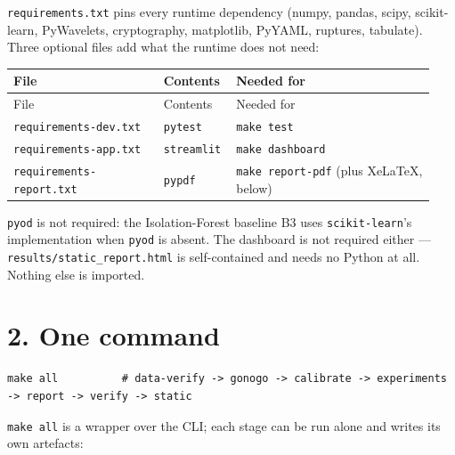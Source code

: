 \documentclass[10pt,a4paper]{article}
\begin{document}
\texttt{requirements.txt} pins every runtime dependency (numpy, pandas, scipy, scikit-\allowbreak{}learn, PyWavelets, cryptography, matplotlib, PyYAML, ruptures, tabulate). Three optional files add what the runtime does not need:

{\small
\setlength{\tabcolsep}{4.5pt}
\setlength{\LTleft}{\fill}
\setlength{\LTright}{\fill}
\begin{longtable}{>{\raggedright\arraybackslash}p{0.345\linewidth}>{\raggedright\arraybackslash}p{0.138\linewidth}>{\raggedright\arraybackslash}p{0.452\linewidth}}
\toprule
File & Contents & Needed for \\
\midrule
\endfirsthead
\toprule
File & Contents & Needed for \\
\midrule
\endhead
\bottomrule
\endlastfoot
\texttt{requirements-\allowbreak{}dev.txt} & \texttt{pytest} & \texttt{make test} \\
\texttt{requirements-\allowbreak{}app.txt} & \texttt{streamlit} & \texttt{make dashboard} \\
\texttt{requirements-\allowbreak{}report.txt} & \texttt{pypdf} & \texttt{make report-\allowbreak{}pdf} (plus XeLaTeX, below) \\
\end{longtable}
}

\texttt{pyod} is not required: the Isolation-\allowbreak{}Forest baseline B3 uses \texttt{scikit-\allowbreak{}learn}'s implementation when \texttt{pyod} is absent. The dashboard is not required either — \texttt{results/\allowbreak{}static\_\allowbreak{}report.html} is self-\allowbreak{}contained and needs no Python at all. Nothing else is imported.

\section*{2. One command}
\begin{Verbatim}[breaklines=true,breakanywhere=true,fontsize=\footnotesize,frame=none,numbers=none]
make all          # data-verify -> gonogo -> calibrate -> experiments -> report -> verify -> static
\end{Verbatim}

\texttt{make all} is a wrapper over the CLI; each stage can be run alone and writes its own artefacts:
\end{document}
